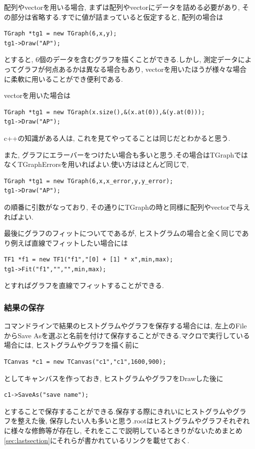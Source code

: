 配列やvectorを用いる場合, まずは配列やvectorにデータを詰める必要があり, その部分は省略する.すでに値が詰まっていると仮定すると, 配列の場合は
\begin{lstlisting}
TGraph *tg1 = new TGraph(6,x,y);
tg1->Draw("AP");
 \end{lstlisting}
とすると, 6個のデータを含むグラフを描くことができる.しかし, 測定データによってグラフが何点あるかは異なる場合もあり, vectorを用いたほうが様々な場合に柔軟に用いることができ便利である.

vectorを用いた場合は
\begin{lstlisting}
TGraph *tg1 = new TGraph(x.size(),&(x.at(0)),&(y.at(0)));
tg1->Draw("AP");
 \end{lstlisting}
c++の知識がある人は, これを見てやってることは同じだとわかると思う.

また, グラフにエラーバーをつけたい場合も多いと思う.その場合はTGraphではなくTGraphErrorsを用いればよい.使い方はほとんど同じで, 
\begin{lstlisting}
TGraph *tg1 = new TGraph(6,x,x_error,y,y_error);
tg1->Draw("AP");
 \end{lstlisting}
の順番に引数がなっており, その通りにTGraphの時と同様に配列やvectorで与えればよい.

最後にグラフのフィットについてであるが, ヒストグラムの場合と全く同じであり例えば直線でフィットしたい場合には
\begin{lstlisting}
TF1 *f1 = new TF1("f1","[0] + [1] * x",min,max);
tg1->Fit("f1","","",min,max);
 \end{lstlisting}
とすればグラフを直線でフィットすることができる.

\subsubsection{結果の保存}
コマンドラインで結果のヒストグラムやグラフを保存する場合には, 左上のFileからSave Asを選ぶと名前を付けて保存することができる.マクロで実行している場合には, ヒストグラムやグラフを描く前に
\begin{lstlisting}
TCanvas *c1 = new TCanvas("c1","c1",1600,900);
 \end{lstlisting}
としてキャンバスを作っておき, ヒストグラムやグラフをDrawした後に
\begin{lstlisting}
c1->SaveAs("save name");
 \end{lstlisting}
とすることで保存することができる.保存する際にきれいにヒストグラムやグラフを整えた後, 保存したい人も多いと思う.rootはヒストグラムやグラフそれぞれに様々な修飾等が存在し, それをここで説明しているときりがないためまとめ\ref{sec:lastsection}にそれらが書かれているリンクを載せておく.

